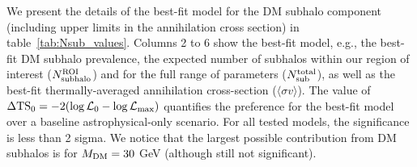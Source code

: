 \documentclass[12pt, a4paper]{article}
\newcommand{\new}[1]{\textcolor{blue}{#1}}
\newcommand{\old}[1]{\textcolor{red}{\st{#1}}}
\newcommand{\aure}[1]{\textcolor{orange}{[AA: #1]}}
\newcommand{\sigmav}{\langle \sigma v \rangle}
\newcommand{\mdm}{{M_{\rm DM}}}
\begin{document}

We present the details of the best-fit model for the DM subhalo component (including upper limits in the annihilation cross section)
in table~\ref{tab:Nsub_values}.
Columns 2 to 6 show the best-fit model, e.g., the best-fit DM subhalo prevalence, the expected number of subhalos within our region of interest ($N_{\rm subhalo}^{\rm ROI}$) and for the full range of parameters ($N_{\rm sub}^{\rm total}$), as well as the best-fit thermally-averaged annihilation cross-section ($\sigmav$). The value of $\Delta {\rm TS}_0 = -2(\log\mathcal{L}_0 - \log\mathcal{L}_{\rm max})$ quantifies the preference for the best-fit model over a baseline astrophysical-only scenario. 
For all tested models, the significance is less than 2 sigma.
We notice that the largest possible contribution from DM subhalos is for $\mdm = 30$ GeV (although still not significant). 
\end{document}
